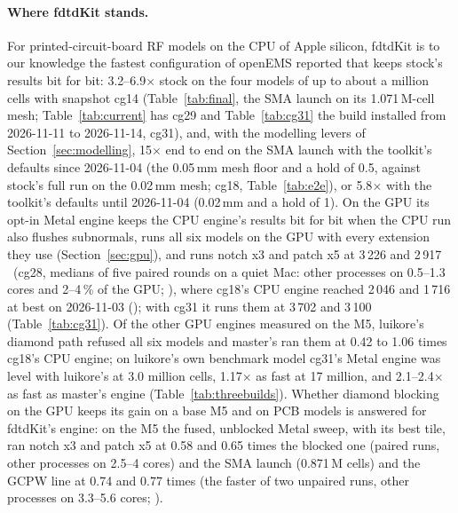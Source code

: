 \paragraph{Where fdtdKit stands.} For printed-circuit-board RF models on the CPU of Apple silicon, fdtdKit is to our
knowledge the fastest configuration of openEMS reported that keeps stock's results bit for bit: 3.2--6.9$\times$ stock
on the four models of up to about a million cells with snapshot cg14 (Table~\ref{tab:final}, the SMA launch on its
1.071\,M-cell mesh; Table~\ref{tab:current} has cg29 and Table~\ref{tab:cg31} the build installed from 2026-11-11 to 2026-11-14, cg31), and,
with the modelling levers of Section~\ref{sec:modelling}, 15$\times$ end to end on the
SMA launch with the toolkit's defaults since 2026-11-04 (the 0.05\,mm mesh floor and a hold of 0.5, against stock's
full run on the 0.02\,mm mesh; cg18, Table~\ref{tab:e2e}), or 5.8$\times$ with the toolkit's defaults until
2026-11-04 (0.02\,mm and a hold of 1). On the GPU its opt-in Metal engine keeps the CPU engine's results bit for bit
when the CPU run also flushes subnormals, runs all six models on the GPU with every extension they use
(Section~\ref{sec:gpu}), and runs notch x3 and patch x5 at 3\,226 and 2\,917\,\MC\ (cg28, medians of five paired
rounds on a quiet Mac: other processes on 0.5--1.3 cores and 2--4\,\% of the GPU;
), where cg18's CPU engine reached 2\,046 and 1\,716 at
best on 2026-11-03 (); with cg31 it runs them at 3\,702 and 3\,100
(Table~\ref{tab:cg31}). Of the other GPU engines measured on the M5, luikore's diamond path
refused all six models and master's ran them at 0.42 to 1.06 times cg18's CPU engine; on luikore's own benchmark
model cg31's Metal engine was level with luikore's at 3.0 million cells, 1.17$\times$ as fast at 17 million, and
2.1--2.4$\times$ as fast as master's  engine (Table~\ref{tab:threebuilds}). Whether diamond blocking on the
GPU keeps its gain on a base M5 and on PCB models is answered for fdtdKit's engine: on the M5 the fused, unblocked
Metal sweep, with its best tile, ran notch x3 and patch x5 at 0.58 and 0.65 times the blocked one (paired runs, other
processes on 2.5--4 cores) and the SMA launch (0.871\,M cells) and the GCPW line at 0.74 and 0.77 times (the faster
of two unpaired runs, other processes
on 3.3--5.6 cores; ).


